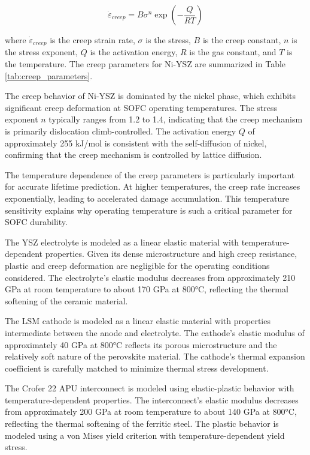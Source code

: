 \documentclass[conference]{IEEEtran}
\begin{document}
\begin{equation}
\dot{\varepsilon}_{creep} = B\sigma^n \exp\left(-\frac{Q}{RT}\right)
\end{equation}

where $\dot{\varepsilon}_{creep}$ is the creep strain rate, $\sigma$ is the stress, $B$ is the creep constant, $n$ is the stress exponent, $Q$ is the activation energy, $R$ is the gas constant, and $T$ is the temperature. The creep parameters for Ni-YSZ are summarized in Table \ref{tab:creep_parameters}.

The creep behavior of Ni-YSZ is dominated by the nickel phase, which exhibits significant creep deformation at SOFC operating temperatures. The stress exponent $n$ typically ranges from 1.2 to 1.4, indicating that the creep mechanism is primarily dislocation climb-controlled. The activation energy $Q$ of approximately 255 kJ/mol is consistent with the self-diffusion of nickel, confirming that the creep mechanism is controlled by lattice diffusion.

The temperature dependence of the creep parameters is particularly important for accurate lifetime prediction. At higher temperatures, the creep rate increases exponentially, leading to accelerated damage accumulation. This temperature sensitivity explains why operating temperature is such a critical parameter for SOFC durability.

The YSZ electrolyte is modeled as a linear elastic material with temperature-dependent properties. Given its dense microstructure and high creep resistance, plastic and creep deformation are negligible for the operating conditions considered. The electrolyte's elastic modulus decreases from approximately 210 GPa at room temperature to about 170 GPa at 800°C, reflecting the thermal softening of the ceramic material.

The LSM cathode is modeled as a linear elastic material with properties intermediate between the anode and electrolyte. The cathode's elastic modulus of approximately 40 GPa at 800°C reflects its porous microstructure and the relatively soft nature of the perovskite material. The cathode's thermal expansion coefficient is carefully matched to minimize thermal stress development.

The Crofer 22 APU interconnect is modeled using elastic-plastic behavior with temperature-dependent properties. The interconnect's elastic modulus decreases from approximately 200 GPa at room temperature to about 140 GPa at 800°C, reflecting the thermal softening of the ferritic steel. The plastic behavior is modeled using a von Mises yield criterion with temperature-dependent yield stress.
\end{document}
